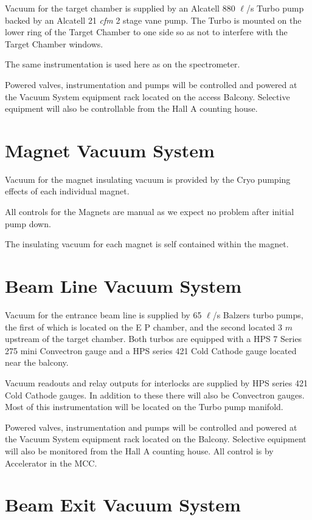 {Vacuum for the target chamber is supplied by an Alcatell 880 $\ell$/s 
Turbo pump backed by an Alcatell 21 \emph{cfm} 2 stage vane pump.  The Turbo is 
mounted on the lower ring of the Target Chamber to one side so as not to 
interfere with the Target Chamber windows.

The same instrumentation is used here as on the spectrometer.

Powered valves, instrumentation and pumps will be controlled and powered 
at the Vacuum System equipment rack located on the access Balcony.  
Selective equipment will also be controllable from the Hall A counting 
house. 

\section{Magnet Vacuum System}

Vacuum for the magnet insulating vacuum is provided by the Cryo
pumping effects of each individual magnet.

All controls for the Magnets are manual as we expect no problem after 
initial pump down.


The insulating vacuum for each magnet is self contained within the 
magnet.

\section{Beam Line Vacuum System}

Vacuum for the entrance beam line is supplied by 65 $\ell$/s Balzers turbo
pumps, the first of which is located on the E P chamber, and the
second located 3 $m$ upstream of the target chamber.  Both turbos
are equipped with a HPS 7 Series 275 mini Convectron gauge and a HPS
series 421 Cold Cathode gauge located near the balcony.

Vacuum readouts and relay outputs for interlocks are supplied by HPS series 421 
Cold Cathode gauges.  In addition to these there will also be Convectron 
gauges.  Most of this instrumentation will be located on the Turbo pump 
manifold.

Powered valves, instrumentation and pumps will be controlled and powered 
at the Vacuum System equipment rack located on the Balcony.  Selective 
equipment will also be monitored from the Hall A counting house.  All 
control is by Accelerator in the MCC.

\section{Beam Exit Vacuum System}

}
